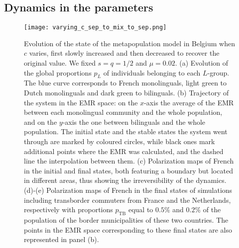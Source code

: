 \documentclass[../thesis.tex]{subfiles}
\begin{document}
\subsection{Dynamics in the parameters}
\begin{figure}
\centering
    \texttt{[image: varying\_c\_sep\_to\_mix\_to\_sep.png]}
    \caption{Evolution of the state of the metapopulation model in Belgium when $c$
    varies, first slowly increased and then decreased to recover the original value. We
    fixed $s=q=1/2$ and $\mu=0.02$. (a) Evolution of the global proportions
    $p_L$ of individuals belonging to each $L$-group. The blue curve corresponds to
    French monolinguals, light green to Dutch monolinguals and dark green to bilinguals.
    (b) Trajectory of the system in the \ac{EMR} space: on the $x$-axis the average
    of the \ac{EMR} between each monolingual community and the whole population, and on the
    $y$-axis the one between bilinguals and the whole population. The initial state and
    the stable states the system went through are marked by coloured circles, while black
    ones mark additional points where the \ac{EMR} was calculated, and the dashed line the
    interpolation between them. (c) Polarization maps of French in the initial
    and final states, both featuring a boundary but located in different areas, thus
    showing the irreversibility of the dynamics. (d)-(e) Polarization
    maps of French in the final states of simulations including transborder commuters
    from France and the Netherlands, respectively with proportions $p_{\text{TB}}$ equal
    to $0.5\%$ and $0.2\%$ of the population of the border municipalities of these two
    countries. The points in the \ac{EMR} space corresponding to these final states are also
    represented in panel (b).}
    \label{fig:varying_c_sep_to_mix_to_sep}
\end{figure}
    
\end{document}
